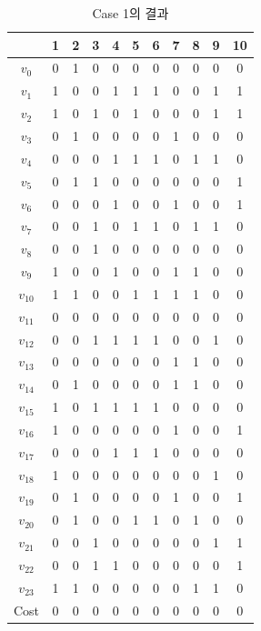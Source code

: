 \documentclass[12pt,a4paper]{article}
\begin{document}
    \begin{table}[htb!]
    \centering
    \begin{tabular}{c c c c c c c c c c c}
        \hline
        & 1 & 2 & 3 & 4 & 5 & 6 & 7 & 8 & 9 & 10 \\
        \hline
        $v_0$ & 0 & 1 & 0 & 0 & 0 & 0 & 0 & 0 & 0 & 0 \\
        $v_1$ & 1 & 0 & 0 & 1 & 1 & 1 & 0 & 0 & 1 & 1 \\
        $v_2$ & 1 & 0 & 1 & 0 & 1 & 0 & 0 & 0 & 1 & 1 \\
        $v_3$ & 0 & 1 & 0 & 0 & 0 & 0 & 1 & 0 & 0 & 0 \\
        $v_4$ & 0 & 0 & 0 & 1 & 1 & 1 & 0 & 1 & 1 & 0 \\
        $v_5$ & 0 & 1 & 1 & 0 & 0 & 0 & 0 & 0 & 0 & 1 \\
        $v_6$ & 0 & 0 & 0 & 1 & 0 & 0 & 1 & 0 & 0 & 1 \\
        $v_7$ & 0 & 0 & 1 & 0 & 1 & 1 & 0 & 1 & 1 & 0 \\
        $v_8$ & 0 & 0 & 1 & 0 & 0 & 0 & 0 & 0 & 0 & 0 \\
        $v_9$ & 1 & 0 & 0 & 1 & 0 & 0 & 1 & 1 & 0 & 0 \\
        $v_{10}$ & 1 & 1 & 0 & 0 & 1 & 1 & 1 & 1 & 0 & 0 \\
        $v_{11}$ & 0 & 0 & 0 & 0 & 0 & 0 & 0 & 0 & 0 & 0 \\
        $v_{12}$ & 0 & 0 & 1 & 1 & 1 & 1 & 0 & 0 & 1 & 0 \\
        $v_{13}$ & 0 & 0 & 0 & 0 & 0 & 0 & 1 & 1 & 0 & 0 \\
        $v_{14}$ & 0 & 1 & 0 & 0 & 0 & 0 & 1 & 1 & 0 & 0 \\
        $v_{15}$ & 1 & 0 & 1 & 1 & 1 & 1 & 0 & 0 & 0 & 0 \\
        $v_{16}$ & 1 & 0 & 0 & 0 & 0 & 0 & 1 & 0 & 0 & 1 \\
        $v_{17}$ & 0 & 0 & 0 & 1 & 1 & 1 & 0 & 0 & 0 & 0 \\
        $v_{18}$ & 1 & 0 & 0 & 0 & 0 & 0 & 0 & 0 & 1 & 0 \\
        $v_{19}$ & 0 & 1 & 0 & 0 & 0 & 0 & 1 & 0 & 0 & 1 \\
        $v_{20}$ & 0 & 1 & 0 & 0 & 1 & 1 & 0 & 1 & 0 & 0 \\
        $v_{21}$ & 0 & 0 & 1 & 0 & 0 & 0 & 0 & 0 & 1 & 1 \\
        $v_{22}$ & 0 & 0 & 1 & 1 & 0 & 0 & 0 & 0 & 0 & 1 \\
        $v_{23}$ & 1 & 1 & 0 & 0 & 0 & 0 & 0 & 1 & 1 & 0 \\
        Cost & 0 & 0 & 0 & 0 & 0 & 0 & 0 & 0 & 0 & 0 \\
       \hline
    \end{tabular}
    \caption{Case 1의 결과}
    \label{tab:result1}
    \end{table}
\end{document}
